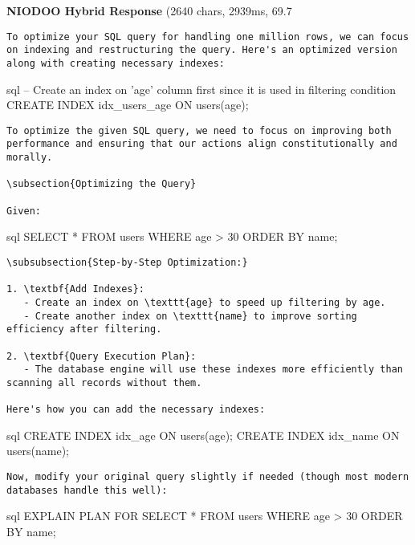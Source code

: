 \documentclass[11pt,a4paper]{article}
\begin{document}
\textbf{NIODOO Hybrid Response} (2640 chars, 2939ms, 69.7%
\begin{verbatim}To optimize your SQL query for handling one million rows, we can focus on indexing and restructuring the query. Here's an optimized version along with creating necessary indexes:

\end{verbatim}sql
-- Create an index on 'age' column first since it is used in filtering condition
CREATE INDEX idx_users_age ON users(age);
\begin{verbatim}
To optimize the given SQL query, we need to focus on improving both performance and ensuring that our actions align constitutionally and morally.

\subsection{Optimizing the Query}

Given:
\end{verbatim}sql
SELECT * 
FROM users 
WHERE age > 30 
ORDER BY name;
\begin{verbatim}
\subsubsection{Step-by-Step Optimization:}

1. \textbf{Add Indexes}:
   - Create an index on \texttt{age} to speed up filtering by age.
   - Create another index on \texttt{name} to improve sorting efficiency after filtering.

2. \textbf{Query Execution Plan}:
   - The database engine will use these indexes more efficiently than scanning all records without them.
   
Here's how you can add the necessary indexes:

\end{verbatim}sql
CREATE INDEX idx_age ON users(age);
CREATE INDEX idx_name ON users(name);
\begin{verbatim}
Now, modify your original query slightly if needed (though most modern databases handle this well):

\end{verbatim}sql
EXPLAIN PLAN FOR
SELECT * 
FROM users 
WHERE age > 30 
ORDER BY name;
\end{document}
